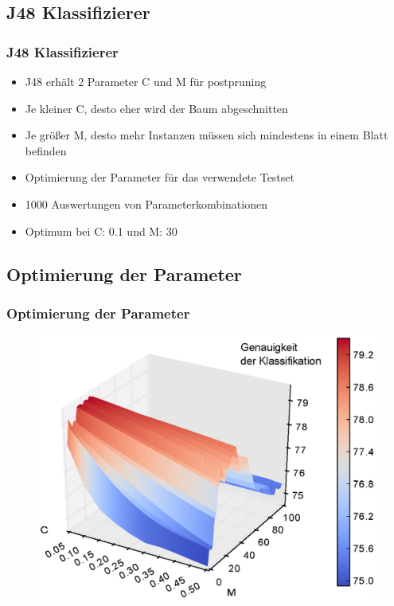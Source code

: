 \documentclass[accentcolor=tud6b,colorbacktitle,inverttitle,landscape,german,presentation,t]{tudbeamer}
\begin{document}
	\subsection{J48 Klassifizierer}
		\begin{frame}
		\frametitle{J48 Klassifizierer}
		\begin{itemize}
		\item J48 erhält 2 Parameter C und M für postpruning
		\item Je kleiner C, desto eher wird der Baum abgeschnitten
		\item Je größer M, desto mehr Instanzen müssen sich mindestens in einem Blatt befinden
		\item Optimierung der Parameter für das verwendete Testset
		\item 1000 Auswertungen von Parameterkombinationen
		\item Optimum bei C: 0.1 und M: 30
		\end{itemize}
		\end{frame}

	\subsection{Optimierung der Parameter}
		\begin{frame}
		\frametitle{Optimierung der Parameter}
		\begin{figure}[Hh]
    		\includegraphics[width=\textwidth,height=\textheight,keepaspectratio]{./img/parameter.eps}
		\end{figure}
		\end{frame}
\end{document}
